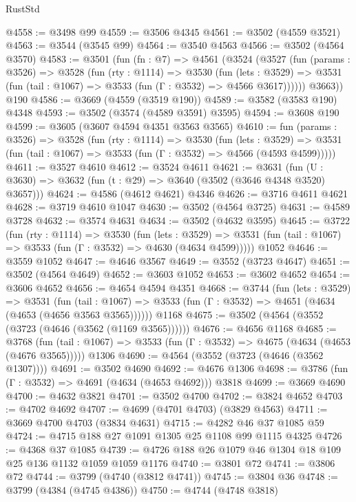 \begin{lexlean}{RustStd}
\begin{coremodule}
@4558 := @3498 @99
@4559 := @3506 @4345
@4561 := @3502 (@4559 @3521)
@4563 := @3544 (@3545 @99)
@4564 := @3540 @4563
@4566 := @3502 (@4564 @3570)
@4583 := @3501
    (fun (fn : @7) =>
    @4561
      (@3524
        (@3527
          (fun (params : @3526) =>
          @3528
            (fun (rty : @1114) =>
            @3530
              (fun (lets : @3529) =>
              @3531 (fun (tail : @1067) => @3533 (fun (Γ : @3532) => @4566 @3617))))))
        @3663))
    @190
@4586 := @3669 (@4559 (@3519 @190))
@4589 := @3582 (@3583 @190) @4348
@4593 := @3502 (@3574 (@4589 @3591) @3595)
@4594 := @3608 @190
@4599 := @3605 (@3607 @4594 @4351 @3563 @3565)
@4610 := fun (params : @3526) =>
  @3528
    (fun (rty : @1114) =>
    @3530
      (fun (lets : @3529) =>
      @3531 (fun (tail : @1067) => @3533 (fun (Γ : @3532) => @4566 (@4593 @4599)))))
@4611 := @3527 @4610
@4612 := @3524 @4611
@4621 := @3631 (fun (U : @3630) => @3632 (fun (t : @29) => @3640 (@3502 (@3646 @4348 @3520) @3657)))
@4624 := @4586 (@4612 @4621) @4346
@4626 := @3716 @4611 @4621
@4628 := @3719 @4610 @1047
@4630 := @3502 (@4564 @3725)
@4631 := @4589 @3728
@4632 := @3574 @4631
@4634 := @3502 (@4632 @3595)
@4645 := @3722
    (fun (rty : @1114) =>
    @3530
      (fun (lets : @3529) =>
      @3531 (fun (tail : @1067) => @3533 (fun (Γ : @3532) => @4630 (@4634 @4599)))))
    @1052
@4646 := @3559 @1052
@4647 := @4646 @3567
@4649 := @3552 (@3723 @4647)
@4651 := @3502 (@4564 @4649)
@4652 := @3603 @1052
@4653 := @3602 @4652
@4654 := @3606 @4652
@4656 := @4654 @4594 @4351
@4668 := @3744
    (fun (lets : @3529) =>
    @3531
      (fun (tail : @1067) => @3533 (fun (Γ : @3532) => @4651 (@4634 (@4653 (@4656 @3563 @3565))))))
    @1168
@4675 := @3502 (@4564 (@3552 (@3723 (@4646 (@3562 (@1169 @3565))))))
@4676 := @4656 @1168
@4685 := @3768
    (fun (tail : @1067) => @3533 (fun (Γ : @3532) => @4675 (@4634 (@4653 (@4676 @3565)))))
    @1306
@4690 := @4564 (@3552 (@3723 (@4646 (@3562 @1307))))
@4691 := @3502 @4690
@4692 := @4676 @1306
@4698 := @3786 (fun (Γ : @3532) => @4691 (@4634 (@4653 @4692))) @3818
@4699 := @3669 @4690
@4700 := @4632 @3821
@4701 := @3502 @4700
@4702 := @3824 @4652
@4703 := @4702 @4692
@4707 := @4699 (@4701 @4703) (@3829 @4563)
@4711 := @3669 @4700 @4703 (@3834 @4631)
@4715 := @4282 @46 @37 @1085 @59
@4724 := @4715 @188 @27 @1091 @1305 @25 @1108 @99 @1115 @4325
@4726 := @4368 @37 @1085
@4739 := @4726 @188 @26 @1079 @46 @1304 @18 @109 @25 @136 @1132 @1059 @1059 @1176
@4740 := @3801 @72
@4741 := @3806 @72
@4744 := @3799 (@4740 (@3812 @4741))
@4745 := @3804 @36
@4748 := @3799 (@4384 (@4745 @4386))
@4750 := @4744 (@4748 @3818)

\end{coremodule}
\end{lexlean}
